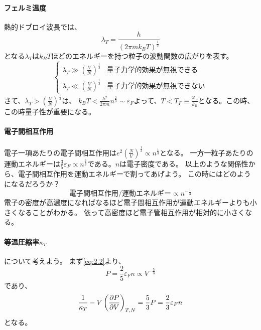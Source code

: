 \documentclass[titlepage]{ltjsarticle}
\begin{document}
\paragraph{フェルミ温度}
熱的ドブロイ波長では、
\begin{equation}
  \lambda_T = \frac{h}{(2\pi m k_BT)^{\frac{1}{2}}}
\end{equation}
となる\(\lambda_T\)は\(k_BT\)ほどのエネルギーを持つ粒子の波動関数の広がりを表す。
\begin{equation}
  \begin{cases}
    \lambda_T \gg \left( \frac{V}{N} \right)^{\frac{1}{3}} & \text{量子力学的効果が無視できる} \\
    \lambda_T \ll \left( \frac{V}{N} \right)^{\frac{1}{3}} & \text{量子力学的効果が無視できない}
  \end{cases}
\end{equation}
さて、\(\lambda_T > \left( \frac{V}{N} \right)^{\frac{1}{3}}\)は、
\(k_BT < \frac{h^2}{2\pi m}n^{\frac{2}{3}}\sim \varepsilon_F\)よって、\(T<T_F\equiv \frac{\varphi_F }{k_B}\)となる。この時、この時量子性が重要になる。

\paragraph{電子間相互作用}
電子一項あたりの電子間相互作用は\(e^2\left( \frac{N}{V} \right)^{\frac{1}{3}}\propto n^{\frac{1}{3}}\)となる。
一方一粒子あたりの運動エネルギーは\(\frac{3}{5}\varepsilon_F \propto n^{\frac{2}{3}}\)である。\(n\)は電子密度である。
以上のような関係性から、電子間相互作用を運動エネルギーで割ってあげよう。
この時にはどのようになるだろうか？
\begin{equation}
  \text{電子間相互作用} / \text{運動エネルギー} \propto n^{-\frac{1}{3}}
\end{equation}
電子の密度が高濃度になればなるほど電子間相互作用が運動エネルギーよりも小さくなることがわかる。
依って高密度ほど電子管相互作用が相対的に小さくなる。

\paragraph{等温圧縮率\(\kappa_T\)}について考えよう。
まず\eqref{eq:2.2}より、
\begin{equation}
  P = \frac{2}{5}\varepsilon_F n \propto V^{-\frac{5}{3}}
\end{equation}
であり、
\begin{equation}
  \frac{1}{\kappa_T} - V \left( \pdv{P}{V} \right)_{T,N} =  \frac{5}{3}P = \frac{2}{3}\varepsilon_F n 
\end{equation}
となる。
\end{document}
